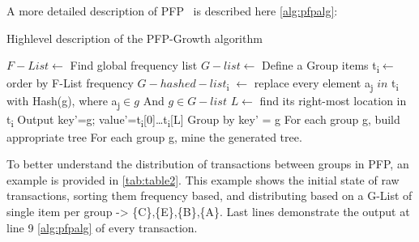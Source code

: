 A more detailed description of PFP~\cite{li2008pfp} is described here \autoref{alg:pfpalg}:
\begin{algorithm}
  \caption{Highlevel description of the PFP-Growth algorithm}\label{euclid}
  \begin{algorithmic}[1]
   \label{alg:pfpalg}
      \State $F-List\gets$ Find global frequency list
      \State $G-list\gets$ Define a Group items
        \State t\textsubscript{i}$\gets$ order by F-List frequency
		\State $G-hashed-list$\textsubscript{i} $\gets$ replace every element a\textsubscript{j} $in$ t\textsubscript{i} with Hash(g), where a\textsubscript{j}$\in g$ And $g\in G-list$
      		\State $L\gets$ find its right-most location in t\textsubscript{i}
      		\State Output key'=g; value'={t\textsubscript{i}[0]…t\textsubscript{i}[L]}
      	\EndFor
      \EndFor
 	\State Group by key' = g
 	\State For each group g, build appropriate tree
 	\State For each group g, mine the generated tree.
    \EndProcedure
  \end{algorithmic}
\end{algorithm}


To better understand the distribution of transactions between groups in PFP, an example is provided in \autoref{tab:table2}. This example shows the initial state of raw transactions, sorting them frequency based, and distributing based on a G-List of single item per group -> \{C\},\{E\},\{B\},\{A\}. Last lines demonstrate the output at line 9 \autoref{alg:pfpalg} of every transaction. 

